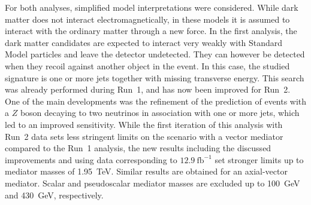 For both analyses, simplified model interpretations were considered. While dark matter does not interact electromagnetically, in these models it is assumed to interact with the ordinary matter through a new force. In the first analysis, the dark matter candidates are expected to interact very weakly with Standard Model particles and leave the detector undetected. They can however be detected when they recoil against another object in the event. In this case, the studied signature is one or more jets together with missing transverse energy. This search was already performed during Run~1, and has now been improved for Run~2. One of the main developments was the refinement of the prediction of events with a $Z$ boson decaying to two neutrinos in association with one or more jets, which led to an improved sensitivity. While the first iteration of this analysis with Run~2 data sets less stringent limits on the scenario with a vector mediator compared to the Run~1 analysis, the new results including the discussed improvements and using data corresponding to $12.9\ \mathrm{fb}^{-1}$ set stronger limits up to mediator masses of \SI{1.95}{TeV}. Similar results are obtained for an axial-vector mediator. Scalar and pseudoscalar mediator masses are excluded up to \SI{100}{GeV} and \SI{430}{GeV}, respectively.


